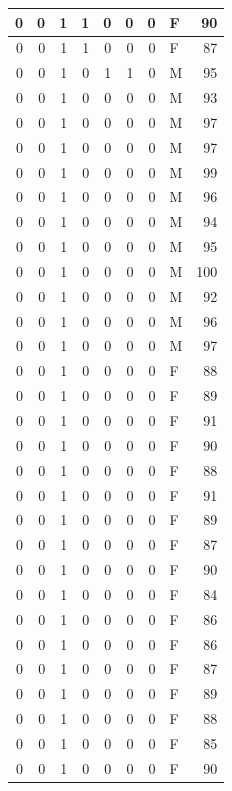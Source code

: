 \documentclass[
  12pt,
]{krantz}
\begin{document}
\begin{tabular}{r|r|r|r|r|r|r|l|r}
\hline
0 & 0 & 1 & 1 & 0 & 0 & 0 & F & 90\\
\hline
0 & 0 & 1 & 1 & 0 & 0 & 0 & F & 87\\
\hline
0 & 0 & 1 & 0 & 1 & 1 & 0 & M & 95\\
\hline
0 & 0 & 1 & 0 & 0 & 0 & 0 & M & 93\\
\hline
0 & 0 & 1 & 0 & 0 & 0 & 0 & M & 97\\
\hline
0 & 0 & 1 & 0 & 0 & 0 & 0 & M & 97\\
\hline
0 & 0 & 1 & 0 & 0 & 0 & 0 & M & 99\\
\hline
0 & 0 & 1 & 0 & 0 & 0 & 0 & M & 96\\
\hline
0 & 0 & 1 & 0 & 0 & 0 & 0 & M & 94\\
\hline
0 & 0 & 1 & 0 & 0 & 0 & 0 & M & 95\\
\hline
0 & 0 & 1 & 0 & 0 & 0 & 0 & M & 100\\
\hline
0 & 0 & 1 & 0 & 0 & 0 & 0 & M & 92\\
\hline
0 & 0 & 1 & 0 & 0 & 0 & 0 & M & 96\\
\hline
0 & 0 & 1 & 0 & 0 & 0 & 0 & M & 97\\
\hline
0 & 0 & 1 & 0 & 0 & 0 & 0 & F & 88\\
\hline
0 & 0 & 1 & 0 & 0 & 0 & 0 & F & 89\\
\hline
0 & 0 & 1 & 0 & 0 & 0 & 0 & F & 91\\
\hline
0 & 0 & 1 & 0 & 0 & 0 & 0 & F & 90\\
\hline
0 & 0 & 1 & 0 & 0 & 0 & 0 & F & 88\\
\hline
0 & 0 & 1 & 0 & 0 & 0 & 0 & F & 91\\
\hline
0 & 0 & 1 & 0 & 0 & 0 & 0 & F & 89\\
\hline
0 & 0 & 1 & 0 & 0 & 0 & 0 & F & 87\\
\hline
0 & 0 & 1 & 0 & 0 & 0 & 0 & F & 90\\
\hline
0 & 0 & 1 & 0 & 0 & 0 & 0 & F & 84\\
\hline
0 & 0 & 1 & 0 & 0 & 0 & 0 & F & 86\\
\hline
0 & 0 & 1 & 0 & 0 & 0 & 0 & F & 86\\
\hline
0 & 0 & 1 & 0 & 0 & 0 & 0 & F & 87\\
\hline
0 & 0 & 1 & 0 & 0 & 0 & 0 & F & 89\\
\hline
0 & 0 & 1 & 0 & 0 & 0 & 0 & F & 88\\
\hline
0 & 0 & 1 & 0 & 0 & 0 & 0 & F & 85\\
\hline
0 & 0 & 1 & 0 & 0 & 0 & 0 & F & 90\\

\end{tabular}
\end{document}

